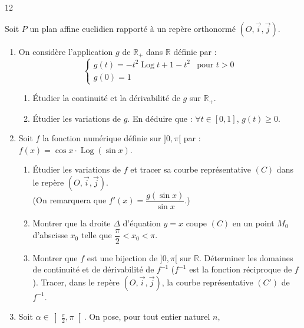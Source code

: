 \documentclass{axiobac}
\begin{document}
\begin{probleme}{12}

Soit $P$ un plan affine euclidien rapporté à un repère orthonormé $(O, \vec{i}, \vec{j})$.

\begin{enumerate}
    \item On considère l'application $g$ de $\mathbb{R}_+$ dans $\mathbb{R}$ définie par :
    \[
    \begin{cases}
        g(t) = -t^2 \operatorname{Log} t + 1 - t^2 & \text{pour } t > 0 \\
        g(0) = 1
    \end{cases}
    \]
    \begin{enumerate}
        \item Étudier la continuité et la dérivabilité de $g$ sur $\mathbb{R}_+$.
        \item Étudier les variations de $g$. En déduire que : $\forall t \in [0, 1]$, $g(t) \geqslant 0$.
    \end{enumerate}
    \item Soit $f$ la fonction numérique définie sur $]0, \pi[$ par : $f(x) = \cos x \cdot \operatorname{Log}(\sin x)$.
    \begin{enumerate}
        \item Étudier les variations de $f$ et tracer sa courbe représentative $(C)$ dans le repère $(O, \vec{i}, \vec{j})$. \\
        (On remarquera que $f'(x) = \dfrac{g(\sin x)}{\sin x}$.)
        \item Montrer que la droite $\Delta$ d'équation $y = x$ coupe $(C)$ en un point $M_0$ d'abscisse $x_0$ telle que $\dfrac{\pi}{2} < x_0 < \pi$.
        \item Montrer que $f$ est une bijection de $]0, \pi[$ sur $\mathbb{R}$. Déterminer les domaines de continuité et de dérivabilité de $f^{-1}$ ($f^{-1}$ est la fonction réciproque de $f$). Tracer, dans le repère $(O, \vec{i}, \vec{j})$, la courbe représentative $(C')$ de $f^{-1}$.
    \end{enumerate}
    \item Soit $\alpha \in \left]\frac{\pi}{2}, \pi\right[$. On pose, pour tout entier naturel $n$,

\end{enumerate}
\end{probleme}
\end{document}
